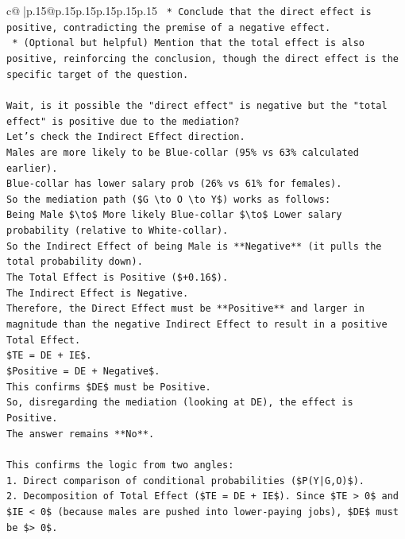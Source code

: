 \documentclass{article}
\begin{document}
{\begin{supertabular}{c@{$\;$}|p{.15\linewidth}@{}p{.15\linewidth}p{.15\linewidth}p{.15\linewidth}p{.15\linewidth}p{.15\linewidth}}
{{{\texttt{    *   Conclude that the direct effect is positive, contradicting the premise of a negative effect.} \\
\texttt{    *   (Optional but helpful) Mention that the total effect is also positive, reinforcing the conclusion, though the direct effect is the specific target of the question.} \\
\\ 
\texttt{Wait, is it possible the "direct effect" is negative but the "total effect" is positive due to the mediation?} \\
\texttt{Let's check the Indirect Effect direction.} \\
\texttt{Males are more likely to be Blue{-}collar (95\% vs 63\% calculated earlier).} \\
\texttt{Blue{-}collar has lower salary prob (26\% vs 61\% for females).} \\
\texttt{So the mediation path (\$G \textbackslash{}to O \textbackslash{}to Y\$) works as follows:} \\
\texttt{Being Male \$\textbackslash{}to\$ More likely Blue{-}collar \$\textbackslash{}to\$ Lower salary probability (relative to White{-}collar).} \\
\texttt{So the Indirect Effect of being Male is **Negative** (it pulls the total probability down).} \\
\texttt{The Total Effect is Positive (\$+0.16\$).} \\
\texttt{The Indirect Effect is Negative.} \\
\texttt{Therefore, the Direct Effect must be **Positive** and larger in magnitude than the negative Indirect Effect to result in a positive Total Effect.} \\
\texttt{\$TE = DE + IE\$.} \\
\texttt{\$Positive = DE + Negative\$.} \\
\texttt{This confirms \$DE\$ must be Positive.} \\
\texttt{So, disregarding the mediation (looking at DE), the effect is Positive.} \\
\texttt{The answer remains **No**.} \\
\\ 
\texttt{This confirms the logic from two angles:} \\
\texttt{1.  Direct comparison of conditional probabilities (\$P(Y|G,O)\$).} \\
\texttt{2.  Decomposition of Total Effect (\$TE = DE + IE\$). Since \$TE > 0\$ and \$IE < 0\$ (because males are pushed into lower{-}paying jobs), \$DE\$ must be \$> 0\$.} \\
}}}
\end{supertabular}}
\end{document}
